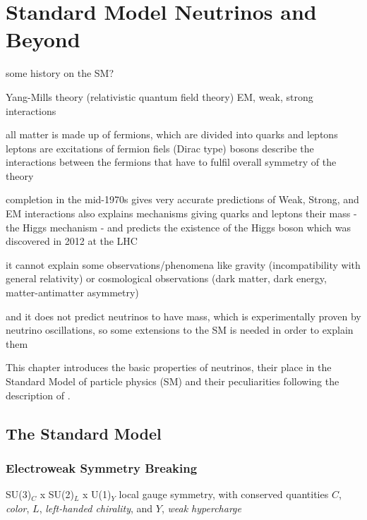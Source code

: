 \setchapterpreamble[u]{\margintoc}

\chapter{Standard Model Neutrinos and Beyond}


some history on the SM?


Yang-Mills theory (relativistic quantum field theory)
EM, weak, strong interactions


all matter is made up of fermions, which are divided into quarks and leptons
leptons are excitations of fermion fiels (Dirac type)
bosons describe the interactions between the fermions that have to fulfil overall symmetry of the theory

completion in the mid-1970s
gives very accurate predictions of Weak, Strong, and EM interactions
also explains mechanisms giving quarks and leptons their mass - the Higgs mechanism - and predicts the existence of the Higgs boson which was discovered in 2012 at the LHC

it cannot explain some observations/phenomena like gravity (incompatibility with general relativity) or cosmological observations (dark matter, dark energy, matter-antimatter asymmetry)

and it does not predict neutrinos to have mass, which is experimentally proven by neutrino oscillations, so some extensions to the SM is needed in order to explain them 





This chapter introduces the basic properties of neutrinos, their place in the Standard Model of particle physics (SM) and their peculiarities following the description of .



\section{The Standard Model}

\subsection{Electroweak Symmetry Breaking}

SU(3)$_C$ x SU(2)$_L$ x U(1)$_Y$ local gauge symmetry, with conserved quantities $C$, \textit{color}, $L$, \textit{left-handed chirality}, and $Y$, \textit{weak hypercharge}

